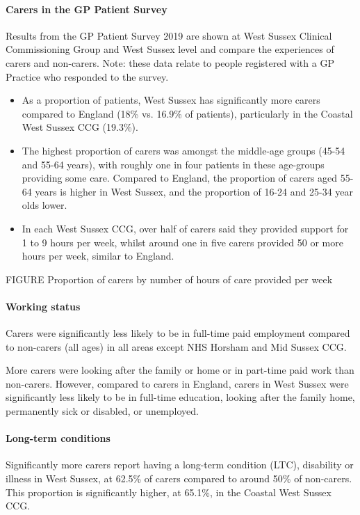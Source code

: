 \paragraph{Carers in the GP Patient Survey} Results from the GP Patient Survey 2019 are shown at West Sussex Clinical Commissioning Group and West Sussex level and compare the experiences of carers and non-carers. Note: these data relate to people registered with a GP Practice who responded to the survey. 

\begin{itemize}[noitemsep]
    \item As a proportion of patients, West Sussex has significantly more carers compared to England (18\% vs. 16.9\% of patients), particularly in the Coastal West Sussex CCG (19.3\%).
    \item The highest proportion of carers was amongst the middle-age groups (45-54 and 55-64 years), with roughly one in four patients in these age-groups providing some care. Compared to England, the proportion of carers aged 55-64 years is higher in West Sussex, and the proportion of 16-24 and 25-34 year olds lower.
    \item In each West Sussex CCG, over half of carers said they provided support for 1 to 9 hours per week, whilst around one in five carers provided 50 or more hours per week, similar to England.
\end{itemize}
  
FIGURE Proportion of carers by number of hours of care provided per week

\paragraph{Working status} Carers were significantly less likely to be in full-time paid employment compared to non-carers (all ages) in all areas except NHS Horsham and Mid Sussex CCG.

More carers were looking after the family or home or in part-time paid work than non-carers. However, compared to carers in England, carers in West Sussex were significantly less likely to be in full-time education, looking after the family home, permanently sick or disabled, or unemployed.

\paragraph{Long-term conditions} Significantly more carers report having a long-term condition (LTC), disability or illness in West Sussex, at 62.5\% of carers compared to around 50\% of non-carers. This proportion is significantly higher, at 65.1\%, in the Coastal West Sussex CCG.

